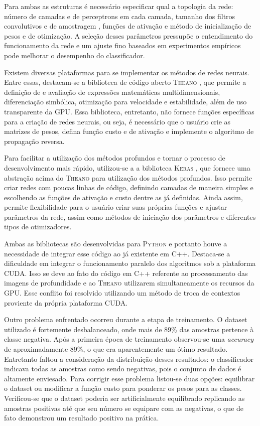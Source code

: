 Para ambas as estruturas é necessário especificar qual a topologia da rede: número de camadas e de perceptrons em cada camada, tamanho dos filtros convolutivos e de amostragem , funções de ativação e método de inicialização de pesos e de otimização.  A seleção desses parâmetros pressupõe o entendimento do funcionamento da rede e um ajuste fino baseados em experimentos empíricos pode melhorar o desempenho do classificador.

Existem diversas plataformas para se implementar os métodos de redes neurais. Entre essas, destacam-se a biblioteca de código aberto \textsc{Theano} \cite{theano}, que permite a definição de e avaliação de expressões matemáticas multidimensionais, diferenciação simbólica, otimização para velocidade e estabilidade, além de uso transparente da GPU. Essa biblioteca, entretanto, não fornece funções específicas para a criação de redes neurais, ou seja, é necessário que o usuário crie as matrizes de pesos, defina função custo e de ativação e implemente o algoritmo de propagação reversa.

Para facilitar a utilização dos métodos profundos e tornar o processo de desenvolvimento mais rápido, utilizou-se a a biblioteca \textsc{Keras} \cite{keras}, que fornece uma abstração acima do \textsc{Theano} para utilização dos métodos profundos. Isso permite criar redes com poucas linhas de código, definindo camadas de maneira simples e escolhendo as funções de ativação e custo dentre as já definidas. Ainda assim, permite flexibilidade para o usuário criar suas próprias funções e ajustar parâmetros da rede, assim como métodos de iniciação dos parâmetros e diferentes tipos de otimizadores.

Ambas as bibliotecas são desenvolvidas para \textsc{Python} e portanto houve a necessidade de integrar esse código ao já existente em C++. Destaca-se a dificuldade em integrar o funcionamento paralelo dos algoritmos sob a plataforma CUDA. Isso se deve ao fato do código em C++ referente ao processamento das imagens de profundidade e ao \textsc{Theano} utilizarem simultaneamente os recursos da GPU. Esse conflito foi resolvido utilizando um método de troca de contextos proviente da própria plataforma CUDA.

Outro problema enfrentado ocorreu durante a etapa de treinamento. O dataset utilizado é fortemente desbalanceado, onde mais de 89\% das amostras pertence à classe negativa. Após a primeira época de treinamento observou-se uma \textit{accuracy} de aproximadamente 89\%, o que era aparentemente um ótimo resultado. Entretanto faltou a consideração da distribuição desses resultados: o classificador indicava todas as amostras como sendo negativas, pois o conjunto de dados é altamente enviesado. Para corrigir esse problema listou-se duas opções: equilibrar o dataset ou modificar a função custo para ponderar os pesos para as classes. Verificou-se que o dataset poderia ser artificialmente equilibrado replicando as amostras positivas até que seu número se equipare com as negativas, o que de fato demonstrou um resultado positivo na prática.

